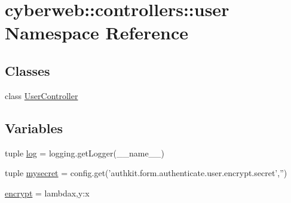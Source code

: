 \hypertarget{namespacecyberweb_1_1controllers_1_1user}{\section{cyberweb\-:\-:controllers\-:\-:user \-Namespace \-Reference}
\label{namespacecyberweb_1_1controllers_1_1user}
}
\subsection*{\-Classes}
\begin{DoxyCompactItemize}
\item 
class \hyperlink{classcyberweb_1_1controllers_1_1user_1_1_user_controller}{\-User\-Controller}
\end{DoxyCompactItemize}
\subsection*{\-Variables}
\begin{DoxyCompactItemize}
\item 
tuple \hyperlink{namespacecyberweb_1_1controllers_1_1user_a5eb124412094c300e54ce37c79914723}{log} = logging.\-get\-Logger(\-\_\-\-\_\-name\-\_\-\-\_\-)
\item 
tuple \hyperlink{namespacecyberweb_1_1controllers_1_1user_aae63d8d481cd98e40f2f5928ad79bacb}{mysecret} = config.\-get('authkit.\-form.\-authenticate.\-user.\-encrypt.\-secret','')
\item 
\hyperlink{namespacecyberweb_1_1controllers_1_1user_a2b687ae0d548d3432685918ff4583f6a}{encrypt} = lambdax,y\-:x
\end{DoxyCompactItemize}


